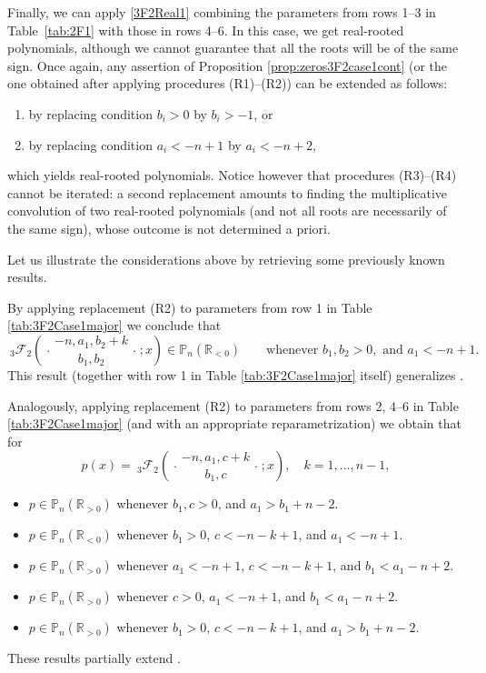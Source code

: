 \documentclass[reqno,11pt]{amsart}
\theoremstyle{remark}
\renewcommand{\P}{\mathbb{P}}
\newcommand{\R}{\mathbb{R}}
\newcommand*\pFq[5]{%
 {\ }_{#1}{\mathcal F}_{#2}{\left(\genfrac..{0pt}{}{#3}{#4};#5\right)}%
}
\begin{document}
Finally, we can apply \eqref{3F2Real1}  combining the parameters from rows 1--3 in Table~\ref{tab:2F1} with those in rows 4--6. In this case, we get real-rooted polynomials, although we cannot guarantee that all the roots will be of the same sign.  Once again, any assertion of Proposition \ref{prop:zeros3F2case1cont} (or the one obtained after applying procedures (R1)--(R2)) can be extended as follows:
\begin{enumerate}
    \item[(R3)] by replacing condition  $b_i>0$ by  $b_i>-1$, or
    \item[(R4)] by replacing condition $a_i<-n+1$ by   $a_i<-n+2$,
\end{enumerate}
which yields real-rooted polynomials. Notice however that procedures (R3)--(R4) cannot be iterated: a second replacement amounts to finding the multiplicative convolution of two real-rooted polynomials (and not all roots are necessarily of the same sign), whose outcome is not determined a priori.  

Let us illustrate the considerations above by retrieving some previously known results.

By applying replacement (R2) to parameters from row 1 in Table \ref{tab:3F2Case1major} we conclude that 
$$
\pFq{3}{2}{-n,a_1,b_2+k}{b_1,b_2}{x} \in \P_n(\R_{<0}) \qquad \text{whenever } b_1, b_2>0,\text{ and }  a_1< -n+1.
$$
This result (together with row 1 in Table \ref{tab:3F2Case1major} itself)   generalizes \cite[Theorem 7]{MR2324318}.

Analogously, applying replacement (R2) to parameters from rows 2, 4--6 in Table \ref{tab:3F2Case1major} (and with an appropriate reparametrization) we obtain that for
$$
p(x)=\pFq{3}{2}{-n,a_1,c+k}{b_1,c}{x}, \quad k=1,\dots, n-1, 
$$
\begin{itemize}
    \item $p \in \P_n(\R_{>0}) $  whenever $ b_1,c >0$,  and  $a_1> b_1 + n-2$.
    \item $p \in \P_n(\R_{<0}) $ whenever $b_1>0$,  $c<-n-k+1$,  and $a_1< -n+1$.
    \item $p \in \P_n(\R_{>0})$ whenever $a_1< -n+1$, $c<-n-k+1$, and $b_1< a_1 - n+2$.
    \item $p \in \P_n(\R_{>0}) $ whenever $c >0$,  $a_1< -n+1$,   and    $b_1< a_1 - n+2$.
    \item $p \in \P_n(\R_{>0})$  whenever $b_1>0$,   $c< -n-k+1$,  and $a_1> b_1 + n-2$.
\end{itemize}
These results partially extend \cite[Corollary 3.2]{johnston2015quasi}.
\end{document}

